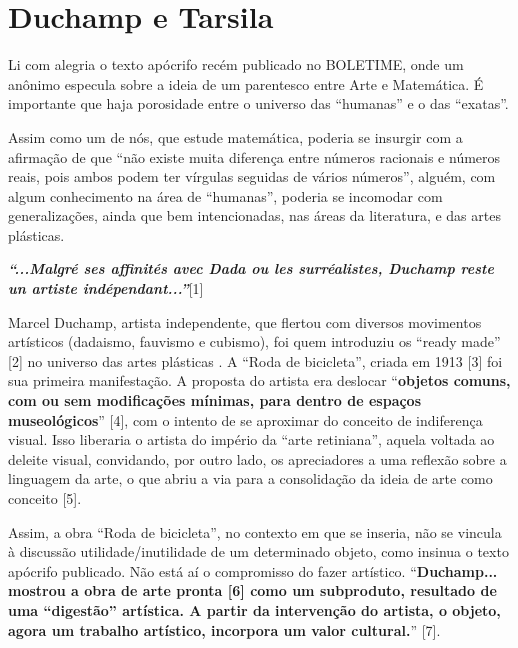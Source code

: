 \section*{Duchamp e Tarsila}
\avisoTextoForms

Li com alegria o texto apócrifo recém publicado no BOLETIME, onde um anônimo especula sobre a ideia de um parentesco entre Arte e Matemática. É importante que haja porosidade entre o universo das “humanas” e o das “exatas”.

Assim como um de nós, que estude matemática, poderia se insurgir com a afirmação de que “não existe muita diferença entre números racionais e números reais, pois ambos podem ter vírgulas seguidas de vários números”, alguém, com algum conhecimento na área de “humanas”, poderia se incomodar com generalizações, ainda que bem intencionadas, nas áreas da literatura, e das artes plásticas.

\begin{displayquote}
    \textit{\textbf{``...Malgré ses affinités avec Dada ou les surréalistes, Duchamp reste un artiste indépendant...''}}[1]
\end{displayquote}

Marcel Duchamp, artista independente, que flertou com diversos movimentos artísticos (dadaismo, fauvismo e cubismo), foi quem introduziu os “ready made” [2] no universo das artes plásticas . A “Roda de bicicleta”, criada em 1913 [3] foi sua primeira manifestação. A proposta do artista era deslocar “\textbf{objetos comuns, com ou sem modificações mínimas, para dentro de espaços museológicos}” [4], com o intento de se aproximar do conceito de indiferença visual. Isso liberaria o artista do império da “arte retiniana”, aquela voltada ao deleite visual, convidando, por outro lado, os apreciadores a uma reflexão sobre a linguagem da arte, o que abriu a via para a consolidação da ideia de arte como conceito [5].

Assim, a obra “Roda de bicicleta”, no contexto em que se inseria, não se vincula à discussão utilidade/inutilidade de um determinado objeto, como insinua o texto apócrifo publicado. Não está aí o compromisso do fazer artístico. “\textbf{Duchamp... mostrou a obra de arte pronta [6] como um subproduto, resultado de uma “digestão” artística. A partir da intervenção do artista, o objeto, agora um trabalho artístico, incorpora um valor cultural.}” [7].

